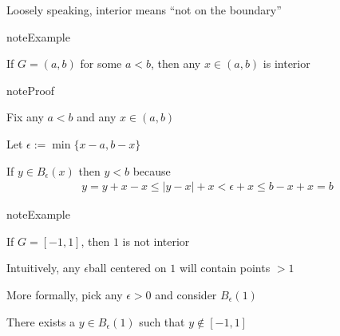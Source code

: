 \documentclass[letterpaper,10pt,english]{jupyterBook}
\begin{document}
\sphinxAtStartPar
Loosely speaking, interior means “not on the boundary”

\begin{figure}[htbp]
\centering

\noindent{}
\end{figure}

\begin{sphinxadmonition}{note}{Example}

\sphinxAtStartPar
If \(G = (a, b)\) for some \(a < b\), then any \(x \in (a, b)\) is interior
\end{sphinxadmonition}

\begin{figure}[htbp]
\centering

\noindent{}
\end{figure}

\begin{sphinxadmonition}{note}{Proof}

\sphinxAtStartPar
Fix any \(a < b\) and any \(x \in (a, b)\)

\sphinxAtStartPar
Let \(\epsilon := \min\{x - a, b - x\}\)

\sphinxAtStartPar
If \(y \in B_\epsilon(x)\) then \(y < b\) because
\begin{equation*}
\begin{split}
%
y 
= y + x - x
\leq |y - x| + x
< \epsilon + x 
\leq b - x + x = b
%
\end{split}
\end{equation*}\end{sphinxadmonition}

\begin{sphinxadmonition}{note}{Example}

\sphinxAtStartPar
If \(G = [-1, 1]\), then \(1\) is not interior
\end{sphinxadmonition}

\begin{figure}[htbp]
\centering

\noindent{}
\end{figure}

\sphinxAtStartPar
Intuitively, any \(\epsilon\)\sphinxhyphen{}ball centered on \(1\) will contain points \(> 1\)

\sphinxAtStartPar
More formally, pick any \(\epsilon > 0\) and consider \(B_\epsilon(1)\)

\sphinxAtStartPar
There exists a \(y \in B_\epsilon(1)\) such that \(y \notin [-1, 1]\)
\end{document}
